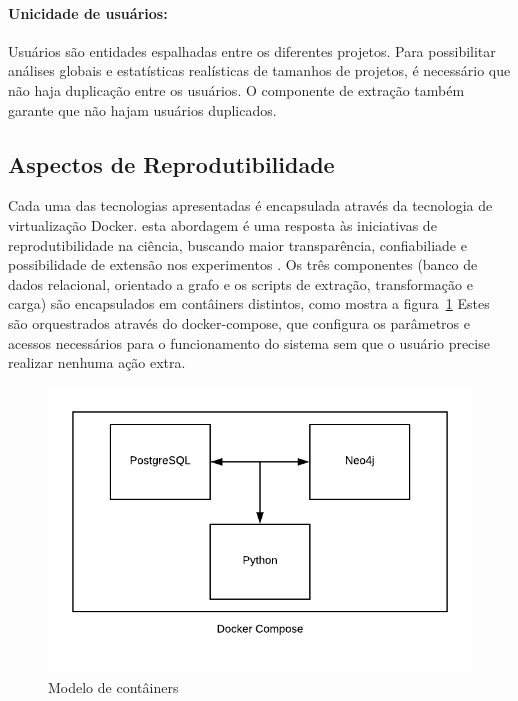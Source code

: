 \documentclass[sigconf]{acmart}
\begin{document}
\paragraph{Unicidade de usuários: } Usuários são entidades espalhadas entre os diferentes projetos. Para possibilitar análises globais e estatísticas realísticas de tamanhos de projetos, é necessário que não haja duplicação entre os usuários. O componente de extração também garante que não hajam usuários duplicados.



\subsection{Aspectos de Reprodutibilidade}

Cada uma das tecnologias apresentadas é encapsulada através da tecnologia de virtualização Docker. esta abordagem é uma resposta às iniciativas de reprodutibilidade na ciência, buscando maior transparência, confiabiliade e possibilidade de extensão nos experimentos \cite{freire2012}. Os três componentes (banco de dados relacional, orientado a grafo e os scripts de extração, transformação e carga) são encapsulados em contâiners distintos, como mostra a figura~\ref{fig:docker-model} Estes são orquestrados através do docker-compose, que configura os parâmetros e acessos necessários para o funcionamento do sistema sem que o usuário precise realizar nenhuma ação extra.

\begin{figure}[!htbp]
 \includegraphics[width=\columnwidth]{docker-model}
 \caption{Modelo de contâiners}\label{fig:docker-model}
\end{figure}
\end{document}

